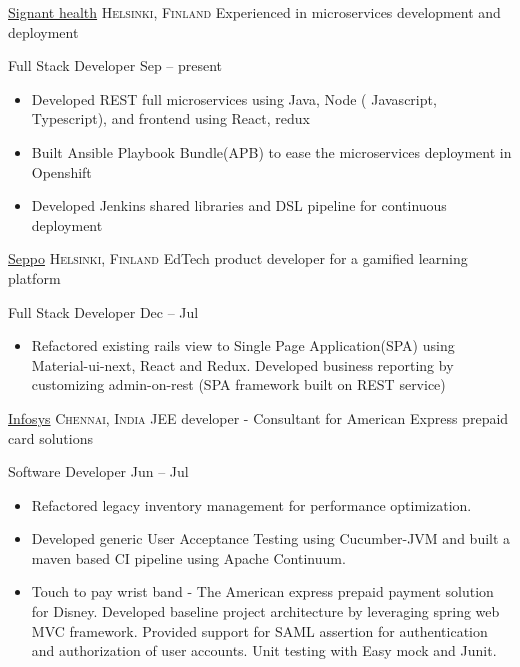 
\headedsection  %
  {\href{https://signanthealth.com/}{Signant health}}
  {\textsc{Helsinki, Finland}} 
  {\newline{}Experienced in microservices development and deployment} 
  {%
  \headedsubsection
    {Full Stack Developer}
    {Sep  -- present}
    {
      \begin{itemize}
        \item Developed REST full microservices using Java, Node ( Javascript, Typescript), and frontend using React, redux
        \item Built Ansible Playbook Bundle(APB) to ease the microservices deployment in Openshift
        \item Developed Jenkins shared libraries and DSL pipeline for continuous deployment
      \end{itemize}
    }
}

\headedsection  %
  {\href{http://www.seppo.io/}{Seppo}}
  {\textsc{Helsinki, Finland}} 
  {\newline{}EdTech product developer for a gamified learning platform} 
  {%
  \headedsubsection
    {Full Stack Developer}
    {Dec  -- Jul }
    {
      \begin{itemize}
        \item Refactored existing rails view to Single Page Application(SPA) using Material-ui-next, React and Redux. Developed business reporting by customizing admin-on-rest (SPA framework built on REST service)
        \end{itemize}
  }
}

\headedsection  %
  {\href{http://www.infosys.com/}{Infosys}}
  {\textsc{Chennai, India}} 
  {\newline{}JEE developer - Consultant for American Express prepaid card solutions} 
  {%
  \headedsubsection
    {Software Developer}
    {Jun  -- Jul }
    {
      \begin{itemize}
        \item Refactored legacy inventory management for performance optimization.
        \item Developed generic User Acceptance Testing using Cucumber-JVM and built a maven based CI pipeline using Apache Continuum.
        \item Touch to pay wrist band - The American express prepaid payment solution for Disney. Developed baseline project architecture by leveraging spring web MVC framework.
              Provided support for SAML assertion for authentication and authorization of user accounts. Unit testing with Easy mock and Junit.
      \end{itemize}
  }
}

